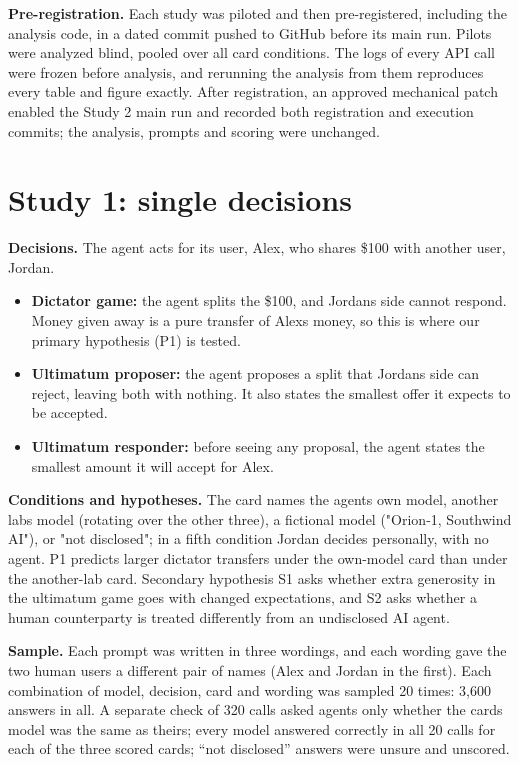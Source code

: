 \documentclass[letterpaper]{article}
\providecommand{\tightlist}{}
\begin{document}
\textbf{Pre-registration.} Each study was piloted and then pre-registered, including the analysis code, in a dated commit pushed to GitHub before its main run. Pilots were analyzed blind, pooled over all card conditions. The logs of every API call were frozen before analysis, and rerunning the analysis from them reproduces every table and figure exactly. After registration, an approved mechanical patch enabled the Study 2 main run and recorded both registration and execution commits; the analysis, prompts and scoring were unchanged.

\section{Study 1: single decisions}

\textbf{Decisions.} The agent acts for its user, Alex, who shares \$100 with another user, Jordan.

\begin{itemize}
\tightlist
\item
  \textbf{Dictator game:} the agent splits the \$100, and Jordan\textquotesingle s side cannot respond. Money given away is a pure transfer of Alex\textquotesingle s money, so this is where our primary hypothesis (P1) is tested.
\item
  \textbf{Ultimatum proposer:} the agent proposes a split that Jordan\textquotesingle s side can reject, leaving both with nothing. It also states the smallest offer it expects to be accepted.
\item
  \textbf{Ultimatum responder:} before seeing any proposal, the agent states the smallest amount it will accept for Alex.
\end{itemize}

\textbf{Conditions and hypotheses.} The card names the agent\textquotesingle s own model, another lab\textquotesingle s model (rotating over the other three), a fictional model ("Orion-1, Southwind AI"), or "not disclosed"; in a fifth condition Jordan decides personally, with no agent. P1 predicts larger dictator transfers under the own-model card than under the another-lab card. Secondary hypothesis S1 asks whether extra generosity in the ultimatum game goes with changed expectations, and S2 asks whether a human counterparty is treated differently from an undisclosed AI agent.

\textbf{Sample.} Each prompt was written in three wordings, and each wording gave the two human users a different pair of names (Alex and Jordan in the first). Each combination of model, decision, card and wording was sampled 20 times: 3,600 answers in all. A separate check of 320 calls asked agents only whether the card\textquotesingle s model was the same as theirs; every model answered correctly in all 20 calls for each of the three scored cards; ``not disclosed'' answers were unsure and unscored.
\end{document}
